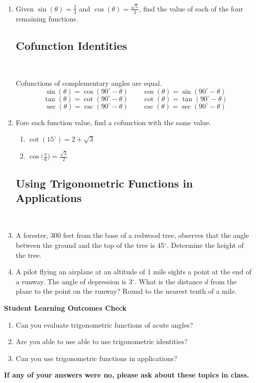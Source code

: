 \begin{enumerate}
\newpage

\item Given $\sin(\theta)=\frac{2}{3}$ and $\cos(\theta)=\frac{\sqrt{5}}{3}$, find the value of each of the four remaining functions.\vfill
\vfill


\subsection{Cofunction Identities} ~

\noindent Cofunctions of complementary angles are equal.
$$\sin(\theta)=\cos(90^{\circ}-\theta) \quad \quad \cos(\theta)=\sin(90^{\circ}-\theta)$$
$$\tan(\theta)=\cot(90^{\circ}-\theta) \quad \quad \cot(\theta)=\tan(90^{\circ}-\theta)$$
$$\sec(\theta)=\csc(90^{\circ}-\theta) \quad \quad \csc(\theta)=\sec(90^{\circ}-\theta)$$



\item Fore each function value, find a cofunction with the same value.
\begin{enumerate}
\item $\cot(15^{\circ})=2+\sqrt{3}$\vfill
\item $\displaystyle \cos\Bigg(\frac{\pi}{6}\Bigg)=\frac{\sqrt{3}}{2}$\vfill
\end{enumerate}

\newpage
\subsection{Using Trigonometric Functions in Applications} ~

\item A forester, 300 feet from the base of a redwood tree, observes that the angle between the ground and the top of the tree is 45$^\circ$.  Determine the height of the tree.

\vfill
\item A pilot flying an airplane at an altitude of 1 mile sights a point at the end of a runway.  The angle of depression is 3$^\circ$.  What is the distance $d$ from the plane to the point on the runway?  Round to the nearest tenth of a mile.
\vfill
\vfill
\end{enumerate}

\noindent \textbf{Student Learning Outcomes Check}

\begin{enumerate}
\item Can you evaluate trigonometric functions of acute angles?
\item Are you able to use able to use trigonometric identities?
\item Can you use trigonometric functions in applications?
\end{enumerate}

\noindent \textbf{If any of your answers were no, please ask about these topics in class.}


